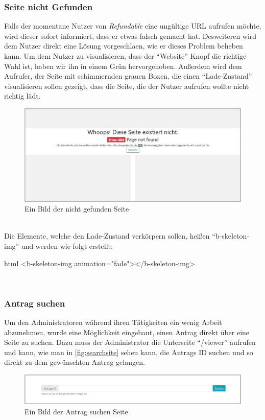 \subsubsection{Seite nicht Gefunden}
\label{chapter:implementierung-frontend-komponenten-notfound}
Falls der momentane Nutzer von \textit{Refundable} eine ungültige URL aufrufen möchte, wird dieser sofort informiert, dass er etwas falsch gemacht hat. Desweiteren wird dem Nutzer direkt eine Lösung vorgeschlaen, wie er dieses Problem beheben kann. Um dem Nutzer zu visualisieren, dass der \enquote{Website} Knopf die richtige Wahl ist, haben wir ihn in einem Grün hervorgehoben. Außerdem wird dem Aufrufer, der Seite mit schimmernden grauen Boxen, die einen \enquote{Lade-Zustand} visualisieren sollen gezeigt, dass die Seite, die der Nutzer aufrufen wollte nicht richtig lädt.
\begin{figure}[H]
	\centering
	\includegraphics[width=1\linewidth]{images/website/notfound}
	\caption[Nicht gefunden Seite]{Ein Bild der nicht gefunden Seite}
	\label{fig:notfoundsite}
\end{figure}
~\\
Die Elemente, welche den Lade-Zustand verkörpern sollen, heißen \enquote{b-skeleton-img} und werden wie folgt erstellt:
\begin{code}{html}
	<b-skeleton-img animation="fade"></b-skeleton-img>
\end{code}
	\label{list:codeskeleton} ~\\

\newpage
\subsubsection{Antrag suchen}
\label{chapter:implementierung-frontend-komponenten-suchen}
Um den Administratoren während ihren Tätigkeiten ein wenig Arbeit abzunehmen, wurde eine Möglichkeit eingebaut, einen Antrag direkt über eine Seite zu suchen. Dazu muss der Administrator die Unterseite \enquote{/viewer} aufrufen und kann, wie man in \autoref{fig:searchsite} sehen kann, die Antrags ID suchen und so direkt zu dem gewünschten Antrag gelangen.
\begin{figure}[H]
	\centering
	\includegraphics[width=1\linewidth]{images/website/search}
	\caption[Antrag suchen Seite]{Ein Bild der Antrag suchen Seite}
	\label{fig:searchsite}
\end{figure}
~\\

